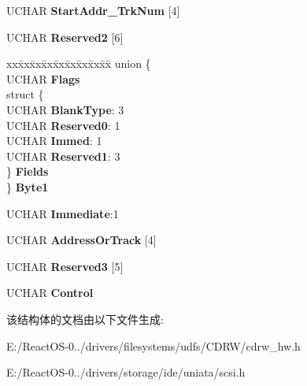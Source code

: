 \begin{DoxyCompactItemize}
\begin{tabbing}
\end{tabbing}\item 
\mbox{\label{struct___c_d_b_1_1___b_l_a_n_k___m_e_d_i_a_ad4019aa2df8e2b2defe0fd26559ef21e}} 
U\+C\+H\+AR {\bfseries Start\+Addr\+\_\+\+Trk\+Num} \mbox{[}4\mbox{]}
\item 
\mbox{\label{struct___c_d_b_1_1___b_l_a_n_k___m_e_d_i_a_a1aece0cca0840574aa7f952bfb929a85}} 
U\+C\+H\+AR {\bfseries Reserved2} \mbox{[}6\mbox{]}
\item 
\mbox{\label{struct___c_d_b_1_1___b_l_a_n_k___m_e_d_i_a_aa76f7eed868a5502b62c8ea71ac62c5e}} 
\begin{tabbing}
xx\=xx\=xx\=xx\=xx\=xx\=xx\=xx\=xx\=\kill
union \{\\
\>UCHAR {\bfseries Flags}\\
\>struct \{\\
\>\>UCHAR {\bfseries BlankType}: 3\\
\>\>UCHAR {\bfseries Reserved0}: 1\\
\>\>UCHAR {\bfseries Immed}: 1\\
\>\>UCHAR {\bfseries Reserved1}: 3\\
\>\} {\bfseries Fields}\\
\} {\bfseries Byte1}\\

\end{tabbing}\item 
\mbox{\label{struct___c_d_b_1_1___b_l_a_n_k___m_e_d_i_a_a68e99047891806587cc4a5a81d81df56}} 
U\+C\+H\+AR {\bfseries Immediate}\+:1
\item 
\mbox{\label{struct___c_d_b_1_1___b_l_a_n_k___m_e_d_i_a_af2f9f6951d1f60e2282fe850db05d2ea}} 
U\+C\+H\+AR {\bfseries Address\+Or\+Track} \mbox{[}4\mbox{]}
\item 
\mbox{\label{struct___c_d_b_1_1___b_l_a_n_k___m_e_d_i_a_ae211bf8f380ccb1c5ed1c4590f0b1ce7}} 
U\+C\+H\+AR {\bfseries Reserved3} \mbox{[}5\mbox{]}
\item 
\mbox{\label{struct___c_d_b_1_1___b_l_a_n_k___m_e_d_i_a_af6fac26523dfda542ccc7c0d5f8da09f}} 
U\+C\+H\+AR {\bfseries Control}
\end{DoxyCompactItemize}


该结构体的文档由以下文件生成\+:\begin{DoxyCompactItemize}
\item 
E\+:/\+React\+O\+S-\/0../drivers/filesystems/udfs/\+C\+D\+R\+W/cdrw\+\_\+hw.\+h\item 
E\+:/\+React\+O\+S-\/0../drivers/storage/ide/uniata/scsi.\+h\end{DoxyCompactItemize}
